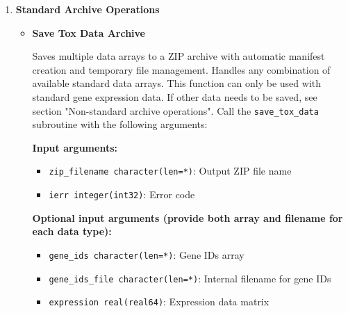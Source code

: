 \documentclass[11pt]{article}
\begin{document}
\begin{enumerate}
\begin{enumerate}
\begin{itemize}
	      	      	\item The module uses allocatable arrays for flexible memory management
	      	      	      
	      	      	\item File operations use Fortran's native unformatted I/O for efficiency
	      	      	      
	      	      	\item Error handling is consistent across all functions for predictable
	      	      	      behavior
	      	      \end{itemize}
	      \end{enumerate}
	      
	\item \textbf{Standard Archive Operations}
	      \begin{itemize}
	      	\item \textbf{Save Tox Data Archive}
	      	      
	      	      Saves multiple data arrays to a ZIP archive with automatic manifest creation
	      	      and temporary file management. Handles any combination of available
	      	      standard data arrays. This function can only be used with standard gene
	      	      expression data. If other data needs to be saved, see section "Non-standard
	      	      archive operations". Call the \texttt{save\_tox\_data} subroutine with
	      	      the following arguments:
	      	      
	      	      \textbf{Input arguments:}
	      	      \begin{itemize}
	      	      	\item \texttt{zip\_filename character(len=*)}: Output ZIP file name
	      	      	      
	      	      	\item \texttt{ierr integer(int32)}: Error code
	      	      \end{itemize}
	      	      \textbf{Optional input arguments (provide both array and filename for each
	      	      data type):}
	      	      \begin{itemize}
	      	      	\item \texttt{gene\_ids character(len=*)}: Gene IDs array
	      	      	      
	      	      	\item \texttt{gene\_ids\_file character(len=*)}: Internal filename for
	      	      	      gene IDs
	      	      	      
	      	      	\item \texttt{expression real(real64)}: Expression data matrix
	      	      	      

\end{itemize}
\end{itemize}
\end{enumerate}
\end{document}
